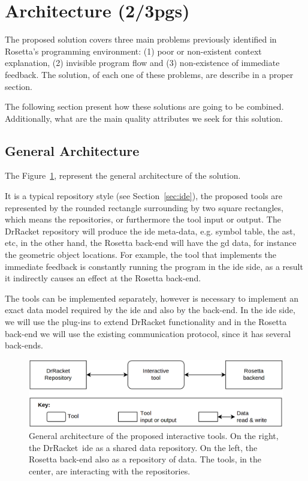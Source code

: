 
% 
% 

\section{Architecture (2/3pgs)}

The proposed solution covers three main problems previously identified in Rosetta's programming environment: (1) poor or non-existent context explanation, (2) invisible program flow and (3) non-existence of immediate feedback. The solution, of each one of these problems, are describe in a proper section. 

The following section present how these solutions are going to be combined. Additionally, what are the main quality attributes we seek for this solution.

\subsection{General Architecture}

The Figure~\ref{fig:sol}, represent the general architecture of the solution.

It is a typical repository style (see Section~\ref{sec:ide}), the proposed tools are represented by the rounded rectangle surrounding by two square rectangles, which means the repositories, or furthermore the tool input or output. The DrRacket repository will produce the \ac{ide} meta-data, e.g. symbol table, the \ac{ast}, etc, in the other hand, the Rosetta back-end will have the \ac{gd} data, for instance the geometric object locations. For example, the tool that implements the immediate feedback is constantly running the program in the \ac{ide} side, as a result it indirectly causes an effect at the Rosetta back-end.

The tools can be implemented separately, however is necessary to implement an exact data model required by the \ac{ide} and also by the back-end. In the \ac{ide} side, we will use the plug-ins to extend DrRacket functionality and in the Rosetta back-end we will use the existing communication protocol, since it has several back-ends. 


\begin{figure}[h]
 \centering
 \includegraphics[scale=0.2]{img/sol}
 \caption{General architecture of the proposed interactive tools. On the right, the DrRacket~\ac{ide} as a shared data repository. On the left, the Rosetta back-end also as a repository of data. The tools, in the center, are interacting with the repositories.}
 \label{fig:sol}
\end{figure}

